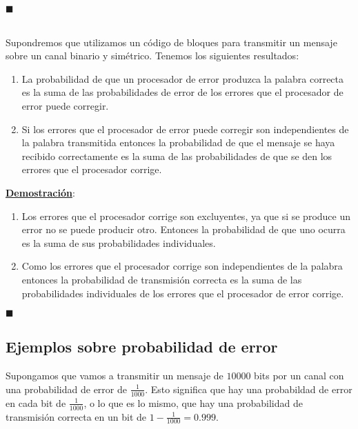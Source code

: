 \begin{flushright}
$\blacksquare$
\end{flushright}
\begin{teorema}
\ \\
Supondremos que utilizamos un c\'odigo de bloques para transmitir un mensaje
sobre un canal binario y sim\'etrico. Tenemos los siguientes resultados:
\begin{enumerate}
\item La probabilidad de que un procesador de error produzca la palabra correcta
es la suma de las probabilidades de error de los errores que el procesador de
error puede corregir.
\item Si los errores que el procesador de error puede corregir son
independientes de la palabra transmitida entonces la probabilidad de que el
mensaje se haya recibido correctamente es la suma de las probabilidades de que
se den los errores que el procesador corrige.
\end{enumerate}
\end{teorema}
\underline{\textbf{Demostraci\'on}}:
\begin{enumerate}
\item Los errores que el procesador corrige son excluyentes, ya que si se
produce un error no se puede producir otro. Entonces la probabilidad de que uno
ocurra es la suma de sus probabilidades individuales.
\item Como los errores que el procesador corrige son independientes de la
palabra entonces la probabilidad de transmisi\'on correcta es la suma de las
probabilidades individuales de los errores que el procesador de error corrige.
\end{enumerate}
\begin{flushright}
$\blacksquare$
\end{flushright}

\subsection{Ejemplos sobre probabilidad de error}

Supongamos que vamos a transmitir un mensaje de $10000$ bits por un canal con
una probabilidad de error de $\frac{1}{1000}$. Esto significa que hay una
probabildad de error en cada bit de $\frac{1}{1000}$, o lo que es lo mismo, que
hay una probabilidad de transmisi\'on correcta en un bit de
$1-\frac{1}{1000}=0.999$.\\


